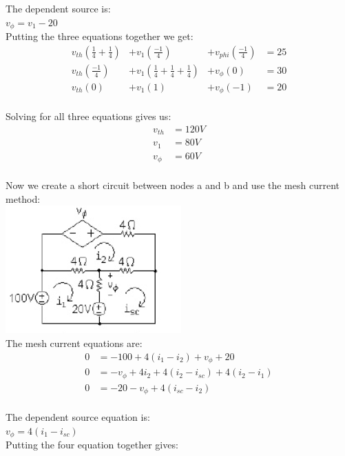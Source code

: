 The dependent source is: \\
$v_{\phi} = v_1 - 20$ \\

Putting the three equations together we get:
\begin{align*}
	v_{th}\left( \frac{1}{4} + \frac{1}{4}  \right) &+ v_1\left( \frac{-1}{4} \right) &+ v_{phi} \left( \frac{-1}{4} \right) &= 25 \\
	v_{th}\left( \frac{-1}{4} \right) &+ v_1 \left( \frac{1}{4} + \frac{1}{4} + \frac{1}{4} \right) &+ v_{\phi}(0) &= 30 \\
	v_{th}(0) &+ v_1(1) &+ v_{\phi}(-1) &= 20 \\
\end{align*}

Solving for all three equations gives us:
\begin{align*}
	v_{th} &= 120 V \\
	v_1 &= 80 V \\
	v_{\phi} &= 60 V \\	
\end{align*}

Now we create a short circuit between nodes a and b and use the mesh current method: \\
\includegraphics{img/c4/a52} \\

The mesh current equations are: \\
\begin{align*}
	0 &= -100 + 4(i_1 - i_2) + v_{\phi} + 20 \\
	0 &= -v_{\phi} + 4i_2 + 4(i_2 -i_{sc}) + 4(i_2 - i_1) \\
	0 &= -20 - v_{\phi} + 4 (i_{sc} - i_2) \\
\end{align*}

The dependent source equation is: \\
$ v_{\phi} = 4(i_1 - i_{sc}) $ \\
Putting the four equation together gives:\\

